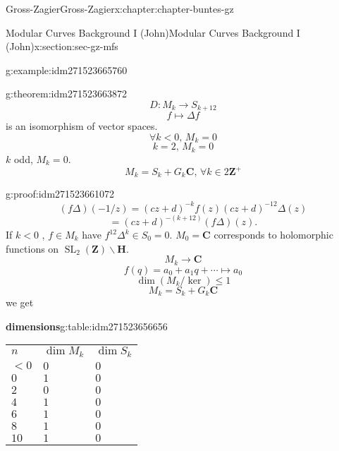 \documentclass[oneside,10pt,]{book}
\numberwithin{equation}{section}
\newcommand{\ZZ}{\mathbf{Z}}
\newcommand{\CC}{\mathbf{C}}
\newcommand{\HH}{\mathbf{H}}
\DeclareMathOperator{\SL}{SL}
\newcommand{\lt}{<}
\begin{document}
\begin{chapterptx}{Gross-Zagier}{}{Gross-Zagier}{}{}{x:chapter:chapter-buntes-gz}
\begin{sectionptx}{Modular Curves Background I (John)}{}{Modular Curves Background I (John)}{}{}{x:section:sec-gz-mfs}
\begin{example}{}{g:example:idm271523665760}
\end{example}
\begin{theorem}{}{}{g:theorem:idm271523663872}%
%
\begin{equation*}
D\colon M_k \to S_{k+12}
\end{equation*}
%
\begin{equation*}
f\mapsto \Delta f
\end{equation*}
is an isomorphism of vector spaces.%
\begin{equation*}
\forall k \lt  0,\, M_k = 0
\end{equation*}
%
\begin{equation*}
k=2,\, M_k = 0
\end{equation*}
\(k\) odd, \(M_k = 0\).%
\begin{equation*}
M_k = S_k + G_k \CC,\,\forall k \in 2\ZZ^+
\end{equation*}
%
\end{theorem}
\begin{proofptx}{}{g:proof:idm271523661072}
%
\begin{equation*}
(f\Delta) (-1/z) = (cz+d)^{-k}f(z) (cz+d)^{-12} \Delta (z)
\end{equation*}
%
\begin{equation*}
= (cz+d)^{-(k+12)}(f\Delta ) (z)\text{.}
\end{equation*}
If \(k \lt  0\) , \(f \in M_k\) have \(f^{12}\Delta ^k \in S_0 = 0\). \(M_0 =\CC\) corresponds to holomorphic functions on \(\SL_2(\ZZ) \backslash \HH\).%
\begin{equation*}
M_k \to \CC
\end{equation*}
%
\begin{equation*}
f(q) = a_0  + a_1 q + \cdots \mapsto a_0
\end{equation*}
%
\begin{equation*}
\dim(M_k / \ker) \le 1
\end{equation*}
%
\begin{equation*}
M_k = S_k + G_k \CC
\end{equation*}
we get%
\begin{tableptx}{\textbf{dimensions}}{g:table:idm271523656656}{}%
\centering
\begin{tabular}{lll}
\(n\)&\(\dim M_k\)&\(\dim S_k\)\tabularnewline[0pt]
\(\lt 0\)&\(0\)&\(0\)\tabularnewline[0pt]
\(0\)&\(1\)&\(0\)\tabularnewline[0pt]
\(2\)&\(0\)&\(0\)\tabularnewline[0pt]
\(4\)&\(1\)&\(0\)\tabularnewline[0pt]
\(6\)&\(1\)&\(0\)\tabularnewline[0pt]
\(8\)&\(1\)&\(0\)\tabularnewline[0pt]
\(10\)&\(1\)&\(0\)\tabularnewline[0pt]

\end{tabular}
\end{tableptx}
\end{proofptx}
\end{sectionptx}
\end{chapterptx}
\end{document}

